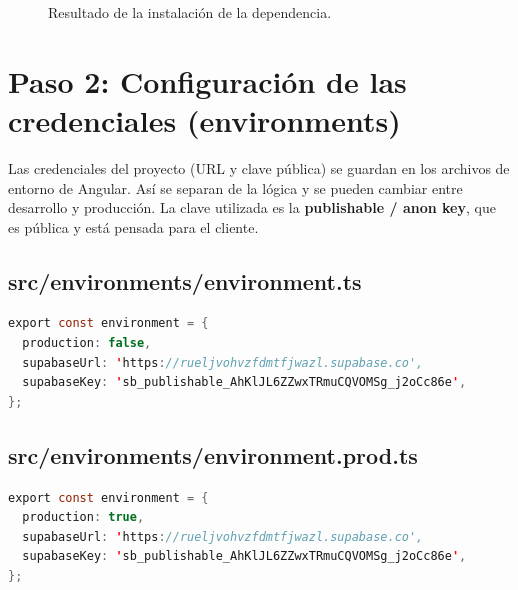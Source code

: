 \documentclass[11pt,a4paper]{article}
\begin{document}
\begin{figure}[H]
  \centering
  \caption{Resultado de la instalación de la dependencia.}
  \label{fig:npm-install}
\end{figure}

\section{Paso 2: Configuración de las credenciales (environments)}

Las credenciales del proyecto (URL y clave pública) se guardan en los archivos
de entorno de Angular. Así se separan de la lógica y se pueden cambiar entre
desarrollo y producción. La clave utilizada es la \textbf{publishable / anon
key}, que es pública y está pensada para el cliente.

\subsection*{src/environments/environment.ts}

\begin{lstlisting}[language=Java,caption={environment.ts (desarrollo)}]
export const environment = {
  production: false,
  supabaseUrl: 'https://rueljvohvzfdmtfjwazl.supabase.co',
  supabaseKey: 'sb_publishable_AhKlJL6ZZwxTRmuCQVOMSg_j2oCc86e',
};
\end{lstlisting}

\subsection*{src/environments/environment.prod.ts}

\begin{lstlisting}[language=Java,caption={environment.prod.ts (produccion)}]
export const environment = {
  production: true,
  supabaseUrl: 'https://rueljvohvzfdmtfjwazl.supabase.co',
  supabaseKey: 'sb_publishable_AhKlJL6ZZwxTRmuCQVOMSg_j2oCc86e',
};
\end{lstlisting}
\end{document}
